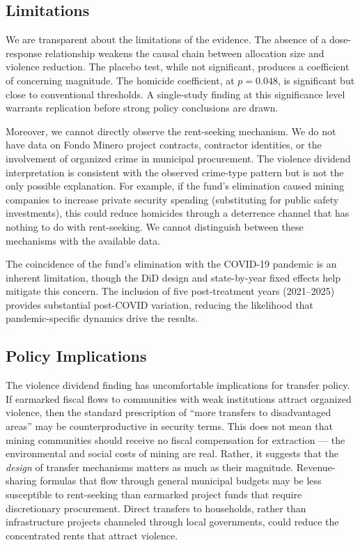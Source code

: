 \documentclass[12pt]{article}
\begin{document}
\subsection{Limitations}

We are transparent about the limitations of the evidence. The absence of a dose-response relationship weakens the causal chain between allocation size and violence reduction. The placebo test, while not significant, produces a coefficient of concerning magnitude. The homicide coefficient, at $p = 0.048$, is significant but close to conventional thresholds. A single-study finding at this significance level warrants replication before strong policy conclusions are drawn.

Moreover, we cannot directly observe the rent-seeking mechanism. We do not have data on Fondo Minero project contracts, contractor identities, or the involvement of organized crime in municipal procurement. The violence dividend interpretation is consistent with the observed crime-type pattern but is not the only possible explanation. For example, if the fund's elimination caused mining companies to increase private security spending (substituting for public safety investments), this could reduce homicides through a deterrence channel that has nothing to do with rent-seeking. We cannot distinguish between these mechanisms with the available data.

The coincidence of the fund's elimination with the COVID-19 pandemic is an inherent limitation, though the DiD design and state-by-year fixed effects help mitigate this concern. The inclusion of five post-treatment years (2021--2025) provides substantial post-COVID variation, reducing the likelihood that pandemic-specific dynamics drive the results.

\subsection{Policy Implications}

The violence dividend finding has uncomfortable implications for transfer policy. If earmarked fiscal flows to communities with weak institutions attract organized violence, then the standard prescription of ``more transfers to disadvantaged areas'' may be counterproductive in security terms. This does not mean that mining communities should receive no fiscal compensation for extraction --- the environmental and social costs of mining are real. Rather, it suggests that the \textit{design} of transfer mechanisms matters as much as their magnitude. Revenue-sharing formulas that flow through general municipal budgets may be less susceptible to rent-seeking than earmarked project funds that require discretionary procurement. Direct transfers to households, rather than infrastructure projects channeled through local governments, could reduce the concentrated rents that attract violence.
\end{document}
